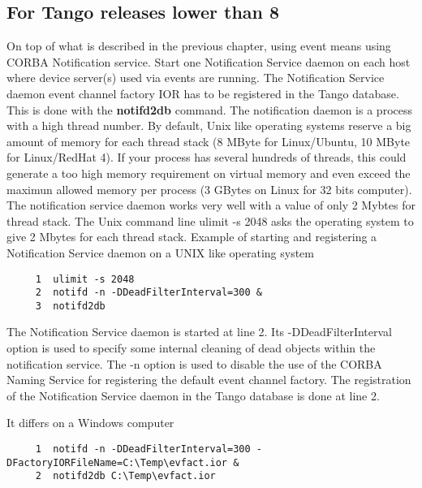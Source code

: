 \subsection{For Tango releases lower than 8}

On top of what is described in the previous chapter, using event means
using CORBA Notification service. Start one Notification Service
daemon on each host where device server(s) used via events are running.
The Notification Service daemon event channel factory IOR has to be
registered in the Tango database. This is done with the \textbf{notifd2db}
command. The notification daemon is a process with a high thread number.
By default, Unix like operating systems reserve a big amount of memory
for each thread stack (8 MByte for Linux/Ubuntu, 10 MByte for Linux/RedHat
4). If your process has several hundreds of threads, this could generate
a too high memory requirement on virtual memory and even exceed the
maximun allowed memory per process (3 GBytes on Linux for 32 bits
computer). The notification service daemon works very well with a
value of only 2 Mybtes for thread stack. The Unix command line \textquotedbl{}ulimit
-s 2048\textquotedbl{} asks the operating system to give 2 Mbytes
for each thread stack. Example of starting and registering a Notification
Service daemon on a UNIX like operating system


\begin{verbatim}
     1  ulimit -s 2048
     2  notifd -n -DDeadFilterInterval=300 &
     3  notifd2db
\end{verbatim}


The Notification Service daemon is started at line 2. Its \textquotedbl{}-DDeadFilterInterval\textquotedbl{}
option is used to specify some internal cleaning of dead objects within
the notification service. The \textquotedbl{}-n\textquotedbl{} option
is used to disable the use of the CORBA Naming Service for registering
the default event channel factory. The registration of the Notification
Service daemon in the Tango database is done at line 2.

It differs on a Windows computer


\begin{verbatim}
     1  notifd -n -DDeadFilterInterval=300 -DFactoryIORFileName=C:\Temp\evfact.ior &
     2  notifd2db C:\Temp\evfact.ior
\end{verbatim}



